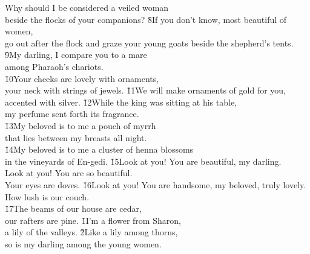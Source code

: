 \begin{poetry}
\poeml Why should I be considered a veiled woman \\
\poemll    beside the flocks of your companions?
\poeml \v{8}If you don't know, most beautiful of women, \\
\poemll    go out after the flock and graze your young goats beside the shepherd's tents. \\
\poeml \v{9}My darling, I compare you to a mare \\
\poemll    among Pharaoh's chariots. \\
\poeml \v{10}Your cheeks are lovely with ornaments, \\
\poemll    your neck with strings of jewels.
\poeml \v{11}We will make ornaments of gold for you, \\
\poemll    accented with silver.
\poeml \v{12}While the king was sitting at his table, \\
\poemll    my perfume sent forth its fragrance. \\
\poeml \v{13}My beloved is to me a pouch of myrrh \\
\poemll    that lies between my breasts all night. \\
\poeml \v{14}My beloved is to me a cluster of henna blossoms \\
\poemll    in the vineyards of En-gedi.
\poeml \v{15}Look at you! You are beautiful, my darling. \\
\poemll    Look at you! You are so beautiful. \\
\poemlll       Your eyes are doves.
\poeml \v{16}Look at you! You are handsome, my beloved, truly lovely. \\
\poemll    How lush is our couch. \\
\poeml \v{17}The beams of our house are cedar, \\
\poemll    our rafters are pine.
\poeml {}
\v{1}I'm a flower from Sharon, \\
\poeml a lily of the valleys.
\poeml \v{2}Like a lily among thorns, \\
\poemll    so is my darling among the young women.

\end{poetry}
